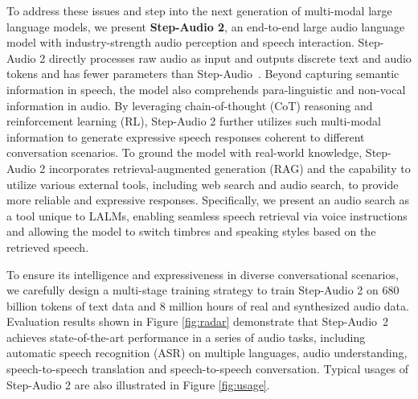 
To address these issues and step into the next generation of multi-modal large language models,
we present \textbf{Step-Audio 2}, an end-to-end large audio language model
with industry-strength audio perception and speech interaction. %
Step-Audio 2 directly processes raw audio as input and outputs discrete text and audio tokens and has fewer parameters than Step-Audio~\cite{huang2025step}. 
Beyond capturing semantic information in speech, the model also comprehends para-linguistic and non-vocal information in audio.
By leveraging chain-of-thought (CoT) reasoning and reinforcement learning (RL), 
Step-Audio 2 further utilizes such multi-modal information to generate expressive speech responses coherent to 
different conversation scenarios.
To ground the model with real-world knowledge,
Step-Audio 2 incorporates retrieval-augmented generation (RAG) and the capability to utilize various external tools, including web search and audio search, to provide more reliable and expressive responses.
Specifically, we present an audio search as a tool unique to LALMs,
enabling seamless speech retrieval via voice instructions and allowing the model to switch timbres and speaking styles based on the retrieved speech.

To ensure its intelligence and
expressiveness in diverse conversational scenarios, 
we carefully design a multi-stage training strategy to train Step-Audio 2 on 680 billion tokens of text data and 8 million hours of real and synthesized audio data.
Evaluation results shown in Figure \ref{fig:radar} demonstrate that Step-Audio~2 achieves state-of-the-art performance in a series of audio tasks, including automatic speech recognition (ASR) on multiple languages, audio understanding, 
speech-to-speech translation and speech-to-speech conversation.
Typical usages of Step-Audio 2 are also illustrated in Figure \ref{fig:usage}.
